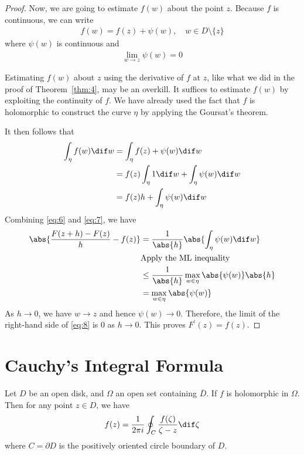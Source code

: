 \documentclass[thmcnt=section, color=cyan, 12pt]{my-elegantbook}
\begin{document}
\begin{proof}
	Now, we are going to estimate $f(w)$ about the point $z$. Because $f$ is continuous, we can write
	\begin{align*}
		f(w) = f(z) + \psi(w), \quad w \in D \setminus \{z\}
	\end{align*}
	where $\psi(w)$ is continuous and
	\begin{align*}
		\lim_{w \to z} \psi(w) = 0
	\end{align*}

	\begin{note}
		Estimating $f(w)$ about $z$ using the derivative of $f$ at $z$,
		like what we did in the proof of Theorem~\ref{thm:4}, may be an overkill.
		It suffices to estimate $f(w)$ by exploiting the continuity of $f$.
		We have already used the fact that $f$ is holomorphic to construct
		the curve $\eta$ by applying the Goursat's theorem.
	\end{note}

	It then follows that
	\begin{align}
		\int_\eta f(w) \dif w
		 & = \int_\eta f(z) + \psi(w) \dif w                    \nonumber \\
		 & = f(z) \int_\eta 1 \dif w + \int_\eta \psi(w) \dif w \nonumber \\
		 & = f(z) h + \int_\eta \psi(w) \dif w
		\label{eq:7}
	\end{align}
	Combining \eqref{eq:6} and \eqref{eq:7}, we have
	\begin{align}
		\abs{\frac{F(z+h) - F(z)}{h} - f(z)}
		 & = \frac{1}{\abs{h}} \abs{\int_\eta \psi(w) \dif w}            \nonumber  \\
		 & \text{Apply the ML inequality}                                 \nonumber \\
		 & \leq \frac{1}{\abs{h}} \max_{w \in \eta} \abs{\psi(w)} \abs{h} \nonumber \\
		 & = \max_{w \in \eta} \abs{\psi(w)}
		\label{eq:8}
	\end{align}
	As $h \to 0$, we have $w \to z$ and hence $\psi(w) \to 0$.
	Therefore, the limit of the right-hand side of \eqref{eq:8}
	is $0$ as $h \to 0$.
	This proves $F^\prime(z) = f(z)$.
\end{proof}


\section{Cauchy's Integral Formula}

\begin{theorem} \label{thm:5}
	Let $D$ be an open disk,
	and $\Omega$ an open set containing $\overline{D}$.
	If $f$ is holomorphic in $\Omega$.
	Then for any point $z \in D$, we have
	\begin{align*}
		f(z) = \frac{1}{2 \pi i} \oint_{C} \frac{f(\zeta)}{\zeta - z} \dif \zeta
	\end{align*}
	where $C = \partial D$ is the positively oriented circle boundary of $D$.
\end{theorem}
\end{document}
